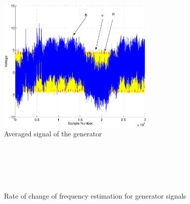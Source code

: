 \begin{figure}[!t]
 \centering
 \includegraphics[width=3.0in]{rybavgkestim}
 \caption{Averaged signal of the generator}
 \label{rybavgKestim}
 \end{figure}
%
 \begin{figure}[!t]
   \centering
      \\
     \\
     \\
      \\

   \caption{Rate of change of frequency estimation for generator signals}
   \label{rybKestim}
 \end{figure}

